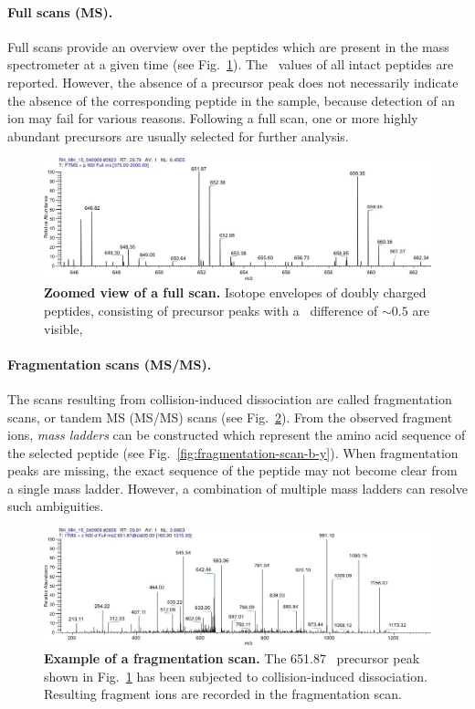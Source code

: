 \paragraph{Full scans (MS).}

Full scans provide an overview over the peptides which are present in the
mass spectrometer at a given time (see Fig.~\ref{fig:full-scan}).
The \mz~values of all intact peptides are reported.
However, the absence of a precursor peak does not necessarily indicate the
absence of the corresponding peptide in the sample, because detection of
an ion may fail for various reasons.
Following a full scan, one or more highly abundant precursors are usually
selected for further analysis.

\begin{figure}[h]
\includegraphics[width=\textwidth]{figures/ms1-scan.jpg}
\caption{
{\bf Zoomed view of a full scan.}
Isotope envelopes of doubly charged peptides, consisting of precursor
peaks with a \mz~difference of $\sim0.5$ are visible,
}
\label{fig:full-scan}
\end{figure}

\paragraph{Fragmentation scans (MS/MS).}

The scans resulting from collision-induced dissociation are called 
fragmentation scans, or tandem MS (MS/MS) scans (see Fig.~\ref{fig:fragmentation-scan}).
From the observed fragment ions, {\em mass ladders} can be constructed which
represent the amino acid sequence of the selected peptide (see Fig.~\ref{fig:fragmentation-scan-b-y}). 
When fragmentation peaks are missing, the exact sequence of the peptide may not
become clear from a single mass ladder.
However, a combination of multiple mass ladders can resolve such ambiguities.

\begin{figure}[h]
\includegraphics[width=\textwidth]{figures/ms2-scan.jpg}
\caption{
{\bf Example of a fragmentation scan.} 
The 651.87 \mz~precursor peak shown in Fig.~\ref{fig:full-scan} has been
subjected to collision-induced dissociation.
Resulting fragment ions are recorded in the fragmentation scan.
}
\label{fig:fragmentation-scan}
\end{figure}

